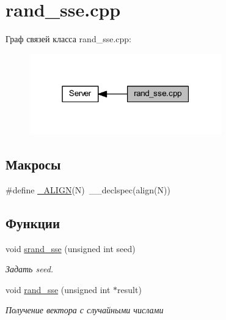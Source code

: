 \hypertarget{group__rand__ssecpp}{}\section{rand\+\_\+sse.\+cpp}
\label{group__rand__ssecpp}
Граф связей класса rand\+\_\+sse.\+cpp\+:
\nopagebreak
\begin{figure}[H]
\begin{center}
\leavevmode
\includegraphics[width=235pt]{group__rand__ssecpp}
\end{center}
\end{figure}
\subsection*{Макросы}
\begin{DoxyCompactItemize}
\item 
\#define \mbox{\hyperlink{group__rand__ssecpp_gae2c66d1d7db5adf0c1853960e2be1119}{\+\_\+\+A\+L\+I\+GN}}(N)~\+\_\+\+\_\+declspec(align(N))
\end{DoxyCompactItemize}
\subsection*{Функции}
\begin{DoxyCompactItemize}
\item 
void \mbox{\hyperlink{group__rand__ssecpp_ga80db1a2aa7de7edf52b9c60e101d556f}{srand\+\_\+sse}} (unsigned int seed)
\begin{DoxyCompactList}\small\item\em Задать seed. \end{DoxyCompactList}\item 
void \mbox{\hyperlink{group__rand__ssecpp_gab7ae3ab6c8fb3e31548413dd0154db7d}{rand\+\_\+sse}} (unsigned int $\ast$result)
\begin{DoxyCompactList}\small\item\em Получение вектора с случайными числами \end{DoxyCompactList}\end{DoxyCompactItemize}


